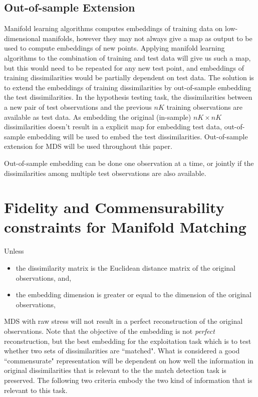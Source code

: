 \documentclass[11pt]{article} %
\begin{document}
\subsection{Out-of-sample Extension}
Manifold learning algorithms computes embeddings of training data on low-dimensional manifolds, however they may not always give a map as output  to  be used to compute embeddings of new points. Applying manifold learning algorithms to the combination  of training and test data  will give us such a map, but this would need to be repeated for any new test point, and embeddings of training dissimilarities would be  partially dependent on test data. The solution is to extend the embeddings of training dissimilarities by out-of-sample embedding the test dissimilarities. 
In the hypothesis testing task, the  dissimilarities   between a new pair of test observations and the previous $nK$ training observations are available as test data. As embedding the original (in-sample) $nK \times nK$ dissimilarities doesn't result in a explicit map for embedding test data, out-of-sample embedding will be used to embed the test dissimilarities.  Out-of-sample extension for MDS will be used throughout this paper\cite{TrossetOOS}. 

Out-of-sample embedding can be done one observation at a time, or jointly if the dissimilarities among multiple test observations are also available. 


\section{Fidelity and Commensurability constraints for Manifold Matching \label{sec:FidComm}}
Unless 
\begin{itemize}
\item the dissimilarity matrix is the Euclidean distance matrix of the original observations, and, 
\item the embedding dimension is greater or equal to the dimension of the original observations,
\end{itemize}
MDS with raw stress will not result in a perfect reconstruction  of the original observations. Note that the objective of the embedding is not \emph{perfect} reconstruction, but the best embedding for the exploitation task which is to test whether two sets of dissimilarities are ``matched". What is considered a good ``commensurate" representation will be dependent on how well the information in original dissimilarities that is relevant to the the match detection task is preserved. The following two criteria  embody the two kind of information  that is relevant to this task.
\end{document}
